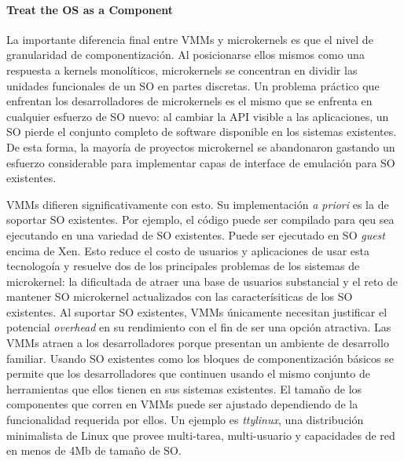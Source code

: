\paragraph{\textnormal{\textbf{Treat the OS as a Component}}}
La importante diferencia final entre VMMs y microkernels es que el nivel de granularidad de componentización. Al posicionarse ellos mismos como una respuesta a kernels monolíticos, microkernels se concentran en dividir las unidades funcionales de un SO en partes discretas. Un problema práctico que enfrentan los desarrolladores de microkernels es el mismo que se enfrenta en cualquier esfuerzo de SO nuevo: al cambiar la API visible a las aplicaciones, un SO pierde el conjunto completo de software disponible en los sistemas existentes. De esta forma, la mayoría de proyectos microkernel se abandonaron gastando un esfuerzo considerable para implementar capas de interface de emulación para SO existentes.

VMMs difieren significativamente con esto. Su implementación \textit{a priori} es la de soportar SO existentes. Por ejemplo, el código puede ser compilado para qeu sea ejecutando en una variedad de SO existentes. Puede ser ejecutado en SO \emph{guest} encima de Xen. Esto reduce el costo de usuarios y aplicaciones de usar esta tecnologoía y resuelve dos de los principales problemas de los sistemas de microkernel: la dificultada de atraer una base de usuarios substancial y el reto de mantener SO microkernel actualizados con las caracterísiticas de los SO existentes. Al suportar SO existentes, VMMs únicamente necesitan justificar el potencial \emph{overhead} en su rendimiento con el fin de ser una opción atractiva. Las VMMs atraen a los desarrolladores porque presentan un ambiente de desarrollo familiar. Usando SO existentes como los bloques de componentización básicos se permite que los desarrolladores que continuen usando el mismo conjunto de herramientas que ellos tienen en sus sistemas existentes. El tamaño de los componentes que corren en VMMs puede ser ajustado dependiendo de la funcionalidad requerida por ellos. Un ejemplo es \emph{ttylinux}, una distribución minimalista de Linux que provee multi-tarea, multi-usuario y capacidades de red en menos de 4Mb de tamaño de SO.

